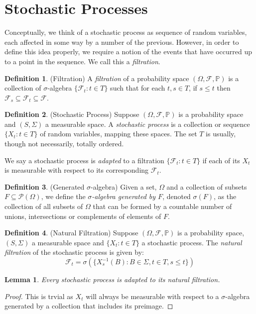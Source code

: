 \documentclass[a4paper,11pt,oneside]{book}
\theoremstyle{plain}
\newtheorem{lem}[thm]{Lemma}
\theoremstyle{definition}
\newtheorem{defn}{Definition}[section]
\begin{document}
\section{Stochastic Processes}
Conceptually, we think of a stochastic process as sequence of random variables, each affected in some way by a number of the previous. However, in order to define this idea properly, we require a notion of the events that have occurred up to a point in the sequence. We call this a \emph{filtration}.
\begin{defn}{(Filtration)}
A \emph{filtration} of a probability space $(\Omega, \mathcal{F}, \mathbb{P})$ is a collection of $\sigma$-algebra $\{\mathcal{F}_t: t \in T\}$ such that for each $t,s \in T$, if $s \leq t$ then $\mathcal{F}_s \subseteq \mathcal{F}_t \subseteq \mathcal{F}$.
\end{defn}
\begin{defn}{(Stochastic Process)}
Suppose $(\Omega,\mathcal{F},\mathbb{P})$ is a probability space and $(S, \Sigma)$ a measurable space. A \emph{stochastic process} is a collection or sequence $\{X_t: t \in T\}$ of random variables, mapping these spaces. The set $T$ is usually, though not necessarily, totally ordered.
\end{defn}
We say a stochastic process is \emph{adapted} to a filtration $\{\mathcal{F}_t: t \in T\}$ if each of its $X_t$ is measurable with respect to its corresponding $\mathcal{F}_t$.
\begin{defn}{(Generated $\sigma$-algebra)}
Given a set, $\Omega$ and a collection of subsets $F \subseteq \mathcal{P}(\Omega)$, we define the \emph{$\sigma$-algebra generated by $F$}, denoted $\sigma(F)$, as the collection of all subsets of $\Omega$ that can be formed by a countable number of unions, intersections or complements of elements of $F$.
\end{defn}
\begin{defn}{(Natural Filtration)}
Suppose $(\Omega,\mathcal{F},\mathbb{P})$ is a probability space, $(S, \Sigma)$ a measurable space and $\{X_t: t \in T\}$ a stochastic process. The \emph{natural filtration} of the stochastic process is given by: \[\mathcal{F}_t=\sigma(\{X_s^{-1}(B): B \in \Sigma, t \in T, s \leq t \})\]
\end{defn}
\begin{lem}
Every stochastic process is adapted to its natural filtration.
\end{lem}
\begin{proof}
This is trvial as $X_t$ will always be measurable with respect to a $\sigma$-algebra generated by a collection that includes its preimage. 
\end{proof}
\end{document}
